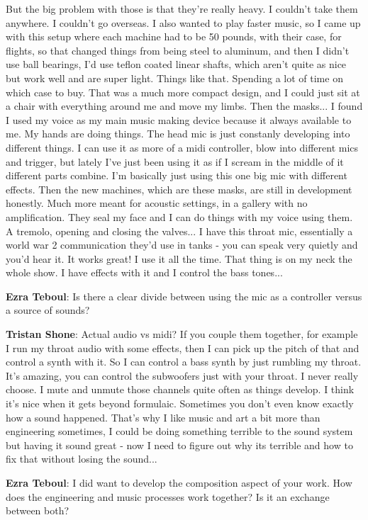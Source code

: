 But the big problem with those is that they're really heavy. I couldn't take them anywhere. I couldn't go overseas. I also wanted to play faster music, so I came up with this setup where each machine had to be 50 pounds, with their case, for flights, so that changed things from being steel to aluminum, and then I didn't use ball bearings, I'd use teflon coated linear shafts, which aren't quite as nice but work well and are super light. Things like that. Spending a lot of time on which case to buy. That was a much more compact design, and I could just sit at a chair with everything around me and move my limbs. Then the masks... I found I used my voice as my main music making device because it always available to me. My hands are doing things. The head mic is just constanly developing into different things. I can use it as more of a midi controller, blow into different mics and trigger, but lately I've just been using it as if I scream in the middle of it different parts combine. I'm basically just using this one big mic with different effects. Then the new machines, which are these masks, are still in development honestly. Much more meant for acoustic settings, in a gallery with no amplification. They seal my face and I can do things with my voice using them. A tremolo, opening and closing the valves... I have this throat mic, essentially a world war 2 communication they'd use in tanks - you can speak very quietly and you'd hear it. It works great! I use it all the time. That thing is on my neck the whole show. I have effects with it and I control the bass tones... 

\textbf{Ezra Teboul}: Is there a clear divide between using the mic as a controller versus a source of sounds? 

\textbf{Tristan Shone}: Actual audio vs midi? If you couple them together, for example I run my throat audio with some effects, then I can pick up the pitch of that and control a synth with it. So I can control a bass synth by just rumbling my throat. It's amazing, you can control the subwoofers just with your throat. I never really choose. I mute and unmute those channels quite often as things develop. I think it's nice when it gets beyond formulaic. Sometimes you don't even know exactly how a sound happened. That's why I like music and art a bit more than engineering sometimes, I could be doing something terrible to the sound system but having it sound great - now I need to figure out why its terrible and how to fix that without losing the sound... 

\textbf{Ezra Teboul}: I did want to develop the composition aspect of your work. How does the engineering and music processes work together? Is it an exchange between both? 

